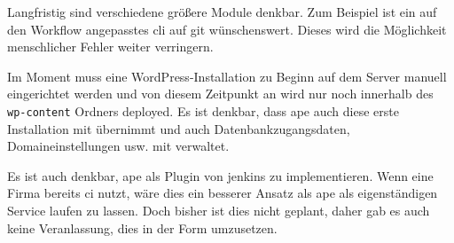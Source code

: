 Langfristig sind verschiedene größere Module denkbar. Zum Beispiel ist ein auf den Workflow angepasstes \gls{cli} auf \gls{git} wünschenswert. Dieses wird die Möglichkeit menschlicher Fehler weiter verringern.

Im Moment muss eine WordPress-Installation zu Beginn auf dem Server manuell eingerichtet werden und von diesem Zeitpunkt an wird nur noch innerhalb des \lstinline!wp-content! Ordners deployed. Es ist denkbar, dass \gls{ape} auch diese erste Installation mit übernimmt und auch Datenbankzugangsdaten, Domaineinstellungen usw. mit verwaltet.

Es ist auch denkbar, \gls{ape} als Plugin von \gls{jenkins} zu implementieren. Wenn eine Firma bereits \gls{ci} nutzt, wäre dies ein besserer Ansatz als \gls{ape} als eigenständigen Service laufen zu lassen. Doch bisher ist dies nicht geplant, daher gab es auch keine Veranlassung, dies in der Form umzusetzen.
